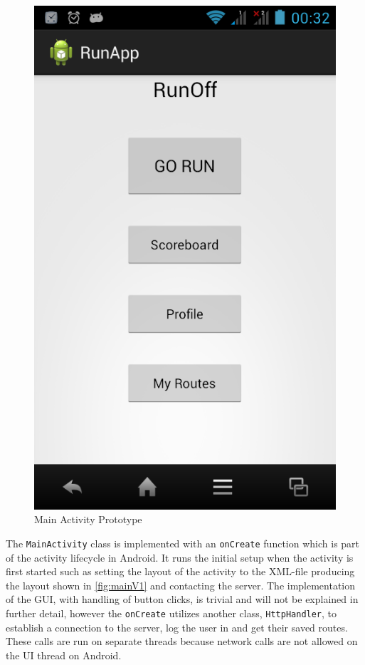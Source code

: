 \begin{figure}[!ht]
	\begin{center}
		\includegraphics[scale=0.4]{img/mainV1.png}
		\caption{Main Activity Prototype}
		\label{fig:mainV1}
	\end{center}
\end{figure}



The \texttt{MainActivity} class is implemented with an \texttt{onCreate} function which is part of the activity lifecycle in Android. It runs the initial setup when the activity is first started such as setting the layout of the activity to the \ac{XML}-file producing the layout shown in \autoref{fig:mainV1} and contacting the server. The implementation of the \ac{GUI}, with handling of button clicks, is trivial and will not be explained in further detail, however the \texttt{onCreate} utilizes another class, \texttt{HttpHandler}, to establish a connection to the server, log the user in and get their saved routes. These calls are run on separate threads because network calls are not allowed on the \ac{UI} thread on Android. 

